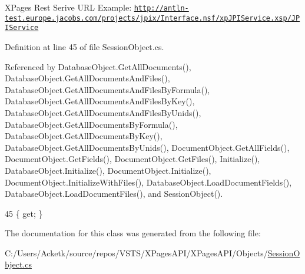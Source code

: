 X\+Pages Rest Serive U\+RL Example\+: \href{http://antln-test.europe.jacobs.com/projects/jpix/Interface.nsf/xpJPIService.xsp/JPIService}{\tt http\+://antln-\/test.\+europe.\+jacobs.\+com/projects/jpix/\+Interface.\+nsf/xp\+J\+P\+I\+Service.\+xsp/\+J\+P\+I\+Service} 



Definition at line 45 of file Session\+Object.\+cs.



Referenced by Database\+Object.\+Get\+All\+Documents(), Database\+Object.\+Get\+All\+Documents\+And\+Files(), Database\+Object.\+Get\+All\+Documents\+And\+Files\+By\+Formula(), Database\+Object.\+Get\+All\+Documents\+And\+Files\+By\+Key(), Database\+Object.\+Get\+All\+Documents\+And\+Files\+By\+Unids(), Database\+Object.\+Get\+All\+Documents\+By\+Formula(), Database\+Object.\+Get\+All\+Documents\+By\+Key(), Database\+Object.\+Get\+All\+Documents\+By\+Unids(), Document\+Object.\+Get\+All\+Fields(), Document\+Object.\+Get\+Fields(), Document\+Object.\+Get\+Files(), Initialize(), Database\+Object.\+Initialize(), Document\+Object.\+Initialize(), Document\+Object.\+Initialize\+With\+Files(), Database\+Object.\+Load\+Document\+Fields(), Database\+Object.\+Load\+Document\+Files(), and Session\+Object().


\begin{DoxyCode}
45 \{ \textcolor{keyword}{get}; \}
\end{DoxyCode}


The documentation for this class was generated from the following file\+:\begin{DoxyCompactItemize}
\item 
C\+:/\+Users/\+Acketk/source/repos/\+V\+S\+T\+S/\+X\+Pages\+A\+P\+I/\+X\+Pages\+A\+P\+I/\+Objects/\mbox{\hyperlink{_session_object_8cs}{Session\+Object.\+cs}}\end{DoxyCompactItemize}
